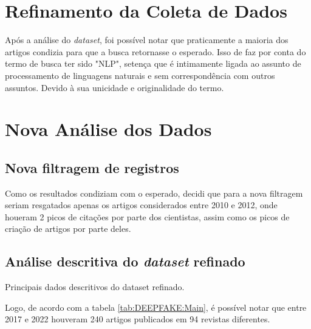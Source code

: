 \section{Refinamento da Coleta de Dados}

Após a análise do \textit{dataset}, foi possível notar que praticamente a maioria dos artigos condizia para que a busca retornasse o esperado. Isso de faz por conta do termo de busca ter sido "NLP", setença que é intimamente ligada ao assunto de processamento de linguagens naturais e sem correspondência com outros assuntos. Devido à sua unicidade e originalidade do termo.

\section{Nova Análise dos Dados}

\subsection{Nova filtragem de registros}

Como os resultados condiziam com o esperado, decidi que para a nova filtragem seriam resgatados apenas os artigos considerados entre 2010 e 2012, onde houeram 2 picos de citações por parte dos cientistas, assim como os picos de criação de artigos por parte deles.


\subsection{Análise descritiva do \textit{dataset} refinado}

\begin{table}[]
    \centering
{}
    \caption{Principais dados descritivos do dataset refinado.}
    \label{tab:DEEPFAKE:Main}
\end{table}

Logo, de acordo com a tabela \ref{tab:DEEPFAKE:Main}, é possível notar que entre 2017 e 2022 houveram 240 artigos publicados em 94 revistas diferentes.